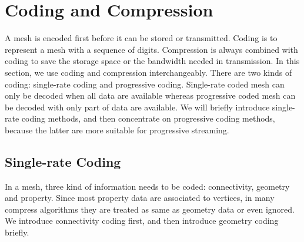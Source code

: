 \documentclass[11pt, a4paper]{report}
\begin{document}
    \section{Coding and Compression}
    A mesh is encoded first before it can be stored or
    transmitted. Coding is to represent a mesh with a sequence of
    digits. Compression is always combined with coding to save the storage space
    or the bandwidth needed in transmission. 
    In this section, we use coding and compression interchangeably.  
    There are two kinds of coding:
    single-rate coding and progressive coding. 
    Single-rate coded mesh can only be decoded when all data are available 
    whereas progressive coded mesh can be decoded with only part of data are available. 
    We will briefly introduce single-rate coding methods, and then concentrate on
    progressive coding methods, because the latter are more suitable for progressive streaming.
    \subsection{Single-rate Coding} \label{single_rate}
    In a mesh, three kind of information needs to be coded:
    connectivity, geometry and property. 
    Since most property data are associated to vertices, 
    in many compress algorithms they are treated as same as geometry data or even
    ignored. We introduce connectivity coding first, and then introduce geometry coding briefly.
    
\end{document}
